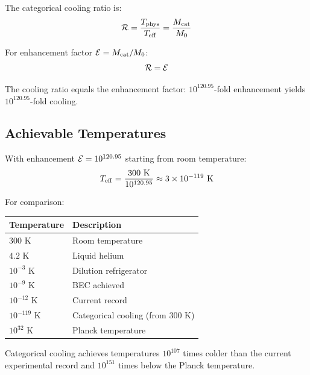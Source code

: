 \begin{definition}
The categorical cooling ratio is:
\begin{equation}
\mathcal{R} = \frac{T_{\mathrm{phys}}}{T_{\mathrm{eff}}} = \frac{M_{\mathrm{cat}}}{M_0}
\end{equation}
\end{definition}

\begin{proposition}
For enhancement factor $\mathcal{E} = M_{\mathrm{cat}}/M_0$:
\begin{equation}
\mathcal{R} = \mathcal{E}
\end{equation}
\end{proposition}

The cooling ratio equals the enhancement factor: $10^{120.95}$-fold enhancement yields $10^{120.95}$-fold cooling.

\subsection{Achievable Temperatures}

\begin{corollary}
\label{cor:temp_limits}
With enhancement $\mathcal{E} = 10^{120.95}$ starting from room temperature:
\begin{equation}
T_{\mathrm{eff}} = \frac{300 \text{ K}}{10^{120.95}} \approx 3 \times 10^{-119} \text{ K}
\end{equation}
\end{corollary}

For comparison:
\begin{center}
\begin{tabular}{ll}
\toprule
Temperature & Description \\
\midrule
$300$ K & Room temperature \\
$4.2$ K & Liquid helium \\
$10^{-3}$ K & Dilution refrigerator \\
$10^{-9}$ K & BEC achieved \\
$10^{-12}$ K & Current record \\
$10^{-119}$ K & Categorical cooling (from 300 K) \\
$10^{32}$ K & Planck temperature \\
\bottomrule
\end{tabular}
\end{center}

Categorical cooling achieves temperatures $10^{107}$ times colder than the current experimental record and $10^{151}$ times below the Planck temperature.

